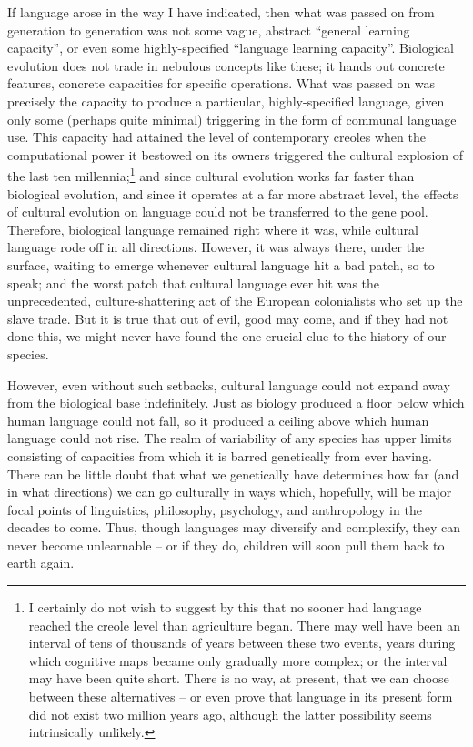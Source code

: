 If language arose in the way I have indicated, then what was passed on from generation to generation was not some vague, abstract ``general learning capacity'', or even some highly-specified ``language
learning capacity''. Biological evolution does not trade in nebulous concepts like these; it hands out concrete features, concrete capacities for specific operations. What was passed on was precisely the capacity to produce a particular, highly-specified language, given only some (perhaps quite minimal) triggering in the form of communal language use. This capacity had attained the level of contemporary creoles when the computational power it bestowed on its owners triggered the cultural explosion of the last ten millennia;\footnote{I certainly do not wish to suggest by this that no sooner had language reached the creole level than agriculture began. There may well have been an interval of tens of thousands of years between these two events, years during which cognitive maps became only gradually more complex; or the interval may have been quite short. There is no way, at present, that we can choose between these alternatives -- or even prove that language in its present form did not exist two million years ago, although the latter possibility seems intrinsically unlikely.} and since cultural evolu\-tion works far faster than biological evolution, and since it operates at a far more abstract level, the effects of cultural evolution on language could not be transferred to the gene pool. Therefore, biological language remained right where it was, while cultural language rode off in all directions. However, it was always there, under the surface, waiting to emerge whenever cultural language hit a bad patch, so to speak; and the worst patch that cultural language ever hit was the unprecedented, culture-shattering act of the European colonialists who set up the slave trade. But it is true that out of evil, good may come, and if they had not done this, we might never have found the one crucial clue to the history of our species.

However, even without such setbacks, cultural language could not expand away from the biological base indefinitely. Just as biology produced a floor below which human language could not fall, so it produced a ceiling above which human language could not rise. The realm of variability of any species has upper limits consisting of capa\-cities from which it is barred genetically from ever having. There can be little doubt that what we genetically have determines how far (and in what directions) we can go culturally in ways which, hopefully, will be major focal points of linguistics, philosophy, psychology, and anthropology in the decades to come. Thus, though languages may diversify and complexify, they can never become unlearnable -- or if they do, children will soon pull them back to earth again.

